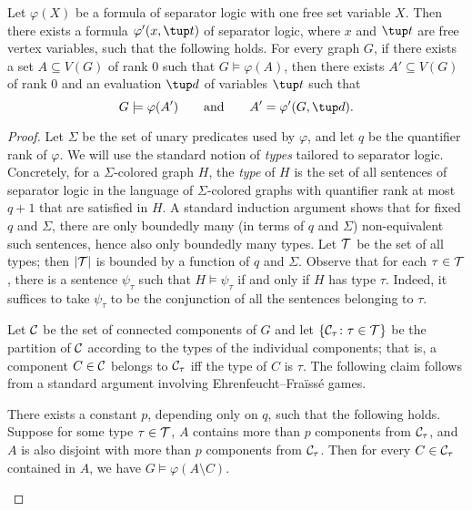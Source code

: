 \begin{lemma}\label{lem:rank0-separator}
 Let $\varphi(X)$ be a formula of separator logic with one free set variable $X$. Then there exists a formula $\varphi'(x,\tup t)$ of separator logic, where $x$ and $\tup t$ are free vertex variables, such that the following holds. For every graph $G$, if there exists a set $A\subseteq V(G)$ of rank $0$ such that $G\models \varphi(A)$, then there exists $A'\subseteq V(G)$ of rank $0$ and an evaluation $\tup d$ of variables $\tup t$ such that
 \[G \models \varphi(A')\qquad \textrm{and}\qquad A' = \varphi'(G, \tup d).\]
\end{lemma}
\begin{proof}
  Let $\Sigma$ be the set of unary predicates used by $\varphi$, and let $q$ be the quantifier rank of $\varphi$. We will use the standard notion of {\em{types}} tailored to separator logic. Concretely, for a $\Sigma$-colored graph $H$, the {\em{type}} of $H$ is the set of all sentences of separator logic in the language of $\Sigma$-colored graphs with quantifier rank at most $q+1$ that are satisfied in $H$. A standard induction argument shows that for fixed $q$ and $\Sigma$, there are only boundedly many (in terms of $q$ and $\Sigma$) non-equivalent such sentences, hence also only boundedly many types. Let $\cal T$ be the set of all types; then $|\cal T|$ is bounded by a function of $q$ and $\Sigma$. Observe that for each $\tau \in \cal T$, there is a sentence $\psi_\tau$ such that $H\models \psi_\tau$ if and only if $H$ has type $\tau$. Indeed, it suffices to take $\psi_\tau$ to be the conjunction of all the sentences belonging to $\tau$.

 Let $\cal C$ be the set of connected components of $G$ and let $\{\cal C_\tau\colon \tau\in \cal T\}$ be the partition of $\cal C$ according to the types of the individual components; that is, a component $C\in \cal C$ belongs to $\cal C_\tau$ iff the type of $C$ is $\tau$. The following claim follows from a standard argument involving Ehrenfeucht--Fra\"iss\'e games.
 
 \begin{claim}\label{cl:EF}
  There exists a constant $p$, depending only on $q$, such that the following holds. Suppose for some type $\tau\in \cal T$, $A$ contains more than $p$ components from $\cal C_\tau$, and $A$ is also disjoint with more than $p$ components from $\cal C_\tau$. Then for every $C\in \cal C_\tau$ contained in $A$, we have $G\models \varphi(A\setminus C)$.
 \end{claim}


\end{proof}
